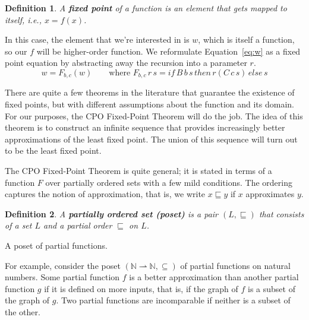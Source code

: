 \documentclass{tufte-handout}
\newcommand{\pto}[0]{\rightharpoonup}
\newtheorem{definition}{Definition}%
\begin{document}
\begin{definition}
A \textbf{\emph{fixed point}} of a function is an element that gets
mapped to itself, i.e., $x = f(x)$.
\end{definition}

In this case, the element that we're interested in is $w$, which is
itself a function, so our $f$ will be higher-order function. We
reformulate Equation~\ref{eq:w} as a fixed point equation by
abstracting away the recursion into a parameter $r$.
\begin{equation} \label{eq:while}
  w = F_{b,c}(w)
  \qquad
  \text{where }
  F_{b,c}\,r\,s = \mathit{if}\, B\,b\,s \,\mathit{then}\, r(C\,c\,s)\,\mathit{else}\,s
\end{equation}

There are quite a few theorems in the literature that guarantee the
existence of fixed points, but with different assumptions about the
function and its domain. For our purposes, the CPO Fixed-Point Theorem
will do the job. The idea of this theorem is to construct an infinite
sequence that provides increasingly better approximations of the least
fixed point. The union of this sequence will turn out to be the least
fixed point.

The CPO Fixed-Point Theorem is quite general; it is stated in terms of
a function $F$ over partially ordered sets with a few mild conditions.
The ordering captures the notion of approximation, that is, we write
$x \sqsubseteq y$ if $x$ approximates $y$.

\begin{definition}
  A \textbf{\emph{partially ordered set (poset)}} is a pair
  $(L,\sqsubseteq)$ that consists of a set $L$ and a partial order
  $\sqsubseteq$ on $L$.
\end{definition}

\begin{marginfigure}
\centering\large
{}
\caption{A poset of partial functions.}
\label{fig:poset-of-partial-functions}
\end{marginfigure}
%
For example, consider the poset
$(\mathbb{N}{\pto}\mathbb{N}, \subseteq)$ of partial
functions on natural numbers. Some partial function $f$ is a better
approximation than another partial function $g$ if it is defined on
more inputs, that is, if the graph of $f$ is a subset of the graph of
$g$.  Two partial functions are incomparable if neither is a subset of
the other.
\end{document}
